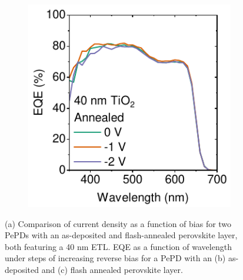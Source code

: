 \begin{figure}[htbp]
\begin{subfigure}[t]{0.32\textwidth}
        \caption{}
        \label{fig:ch2:as_dep_eqe}
    \end{subfigure}
    \hfill
    \begin{subfigure}[t]{0.32\textwidth}
        \centering
        \includegraphics[width=\textwidth]{chapters/material_properties/images/Annealed_EQE.pdf} %
        \caption{}
        \label{fig:ch2:annealed_eqe}
    \end{subfigure}
    \caption{(a) Comparison of current density as a function of bias for two PePDs with an as-deposited and flash-annealed perovskite layer, both featuring a 40 nm  ETL. EQE as a function of wavelength under steps of increasing reverse bias for a PePD with an (b) as-deposited and (c) flash annealed perovskite layer.}
    \label{fig:ETL_opt:annealing_impact}
\end{figure}

